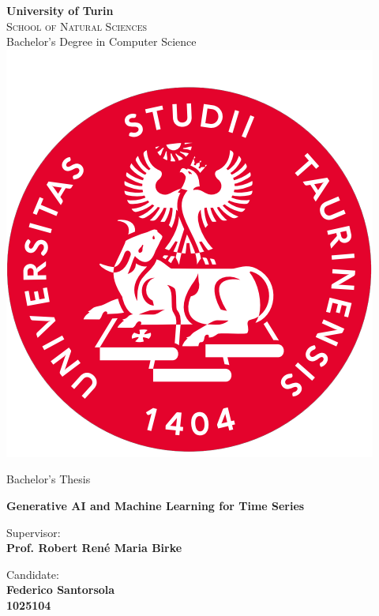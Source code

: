 \begin{titlepage}

\begin{center}

{\huge \textbf{University of Turin}} \\[4pt]
{\Large \textsc{School of Natural Sciences}} \\[2pt]
{\large Bachelor's Degree in Computer Science} \\[8mm]

\includegraphics[keepaspectratio=true,scale=0.4]{images/unito_logo.png} \\[5mm]

\end{center}

\begin{center}
    \LARGE{Bachelor's Thesis}
\end{center}

\vspace{15mm}
\begin{center}
    {\huge\textbf{Generative AI and Machine Learning for Time Series}}
\end{center}
\vspace{30mm}

\begin{minipage}[t]{0.47\textwidth}
	{\large{Supervisor:}{\normalsize\vspace{3mm}
	\bf\\ \large{Prof. Robert René Maria Birke} \normalsize\vspace{3mm}\bf}}
\end{minipage}
\hfill
\begin{minipage}[t]{0.47\textwidth}\raggedleft
	{\large{Candidate:}{\normalsize\vspace{3mm} \bf\\ \large{Federico Santorsola\\1025104}}}
\end{minipage}

\vspace{40 mm}
\hrulefill
\\ 

\end{titlepage}